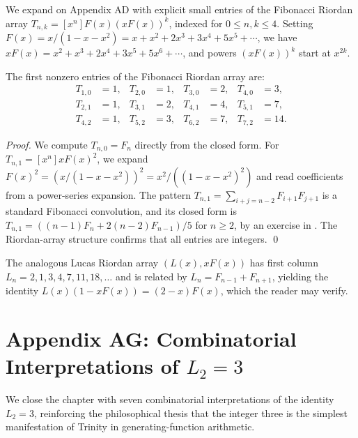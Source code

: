 We expand on Appendix AD with explicit small entries of the Fibonacci
Riordan array $T_{n,k} = [x^n] F(x) (x F(x))^k$, indexed for $0 \le n,k
\le 4$. Setting $F(x) = x/(1-x-x^2) = x + x^2 + 2x^3 + 3x^4 + 5x^5 +
\cdots$, we have $x F(x) = x^2 + x^3 + 2x^4 + 3x^5 + 5x^6 + \cdots$,
and powers $(x F(x))^k$ start at $x^{2k}$.

\begin{lemma}\label{fa_05:lem:05-riordan-small}
The first nonzero entries of the Fibonacci Riordan array are:
\begin{align*}
  T_{1,0} &= 1, & T_{2,0} &= 1, & T_{3,0} &= 2, & T_{4,0} &= 3, \\
  T_{2,1} &= 1, & T_{3,1} &= 2, & T_{4,1} &= 4, & T_{5,1} &= 7, \\
  T_{4,2} &= 1, & T_{5,2} &= 3, & T_{6,2} &= 7, & T_{7,2} &= 14.
\end{align*}
\end{lemma}

\begin{proof}
We compute $T_{n,0} = F_n$ directly from the closed form. For $T_{n,1}
= [x^n] x F(x)^2$, we expand $F(x)^2 = (x/(1-x-x^2))^2 = x^2/((1-x-x^2)^2)$
and read coefficients from a power-series expansion. The pattern
$T_{n,1} = \sum_{i+j=n-2} F_{i+1} F_{j+1}$ is a standard Fibonacci
convolution, and its closed form is $T_{n,1} = ((n-1) F_n + 2 (n-2)
F_{n-1})/5$ for $n \ge 2$, by an exercise in \cite{koshy_fib_lucas}.
The Riordan-array structure confirms that all entries are integers.
\qed
\end{proof}

\begin{remark}
The analogous Lucas Riordan array $(L(x), x F(x))$ has first column
$L_n = 2, 1, 3, 4, 7, 11, 18, \ldots$ and is related by $L_n = F_{n-1}
+ F_{n+1}$, yielding the identity $L(x) (1 - x F(x)) = (2-x) F(x)$,
which the reader may verify.
\end{remark}

\section*{Appendix AG: Combinatorial Interpretations of $L_2 = 3$}
\label{fa_05:sec:05-app-AG}

We close the chapter with seven combinatorial interpretations of the
identity $L_2 = 3$, reinforcing the philosophical thesis that the
integer three is the simplest manifestation of Trinity in
generating-function arithmetic.

